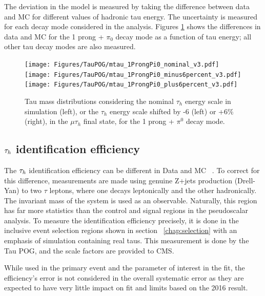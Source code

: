 The deviation in the model is measured by taking the difference between data and MC for different values of hadronic tau energy. The uncertainty is measured for each decay mode considered in the analysis. Figures \ref{fig:taues} shows the differences in data and MC for the 1 prong + $\pi_0$ decay mode as a function of tau energy; all other tau decay modes are also measured. 

\begin{figure}[h!]
    \begin{center}
        \texttt{[image: Figures/TauPOG/mtau\_1ProngPi0\_nominal\_v3.pdf]}
        \texttt{[image: Figures/TauPOG/mtau\_1ProngPi0\_minus6percent\_v3.pdf]}
        \texttt{[image: Figures/TauPOG/mtau\_1ProngPi0\_plus6percent\_v3.pdf]}
    \end{center}
    \caption{Tau mass distributions considering the nominal $\tau_h$ energy scale in simulation (left), or the $\tau_h$ energy scale shifted by -6 (left) or +6\% (right), in the $\mu\tau_h$ final state, for the 1 prong + $\pi^0$ decay mode.}
    \label{fig:taues}
\end{figure}

\subsection{$\tau_h$ identification efficiency}

The $\tau_h$ identification efficiency can be different in Data and MC ~\cite{TAUIDTwiki}. To correct for this difference, measurements are 
made using genuine Z+jets production (Drell-Yan) to two $\tau$ leptons, where one decays leptonically and the other hadronically. The invariant mass of the system is used as an observable. Naturally, this region has far more statistics than the control and signal regions in the pseudoscalar analysis. To measure the identification efficiency precisely, it is done in the inclusive event selection regions shown in section ~\ref{chap:selection} with an emphasis of simulation containing real taus. This measurement is done by the Tau POG, and the scale factors are provided to CMS. 

While used in the primary event and the parameter of interest in the fit, the efficiency's error is not considered in the overall systematic error as they are expected to have very little impact on fit and limits based on the 2016 result. 


